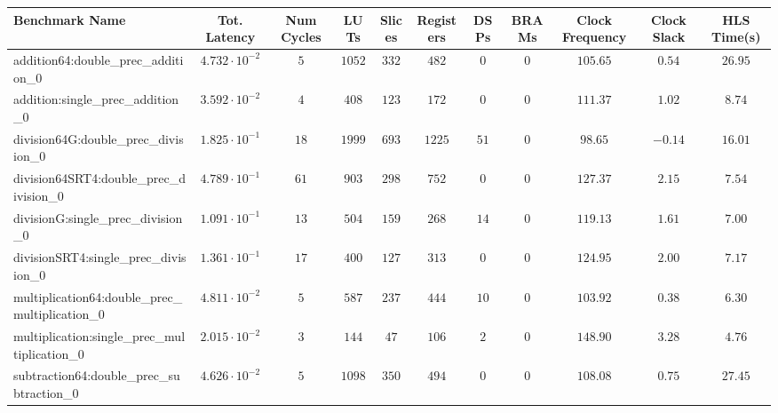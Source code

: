 \begin{tabular}{|l|c|c|c|c|c|c|c|c|c|c|}
\hline
Benchmark Name                                   & Tot. Latency            & Num Cycles & LUTs     & Slices   & Registers & DSPs   & BRAMs & Clock Frequency & Clock Slack & HLS Time(s) \\
\hline
addition64:double\_prec\_addition\_0             & $ 4.732 \cdot 10^{-2} $ & $ 5      $ & $ 1052 $ & $ 332  $ & $ 482   $ & $ 0  $ & $ 0 $ & $ 105.65      $ & $ 0.54    $ & $ 26.95   $ \\
addition:single\_prec\_addition\_0               & $ 3.592 \cdot 10^{-2} $ & $ 4      $ & $ 408  $ & $ 123  $ & $ 172   $ & $ 0  $ & $ 0 $ & $ 111.37      $ & $ 1.02    $ & $ 8.74    $ \\
division64G:double\_prec\_division\_0            & $ 1.825 \cdot 10^{-1} $ & $ 18     $ & $ 1999 $ & $ 693  $ & $ 1225  $ & $ 51 $ & $ 0 $ & $ 98.65       $ & $ -0.14   $ & $ 16.01   $ \\
division64SRT4:double\_prec\_division\_0         & $ 4.789 \cdot 10^{-1} $ & $ 61     $ & $ 903  $ & $ 298  $ & $ 752   $ & $ 0  $ & $ 0 $ & $ 127.37      $ & $ 2.15    $ & $ 7.54    $ \\
divisionG:single\_prec\_division\_0              & $ 1.091 \cdot 10^{-1} $ & $ 13     $ & $ 504  $ & $ 159  $ & $ 268   $ & $ 14 $ & $ 0 $ & $ 119.13      $ & $ 1.61    $ & $ 7.00    $ \\
divisionSRT4:single\_prec\_division\_0           & $ 1.361 \cdot 10^{-1} $ & $ 17     $ & $ 400  $ & $ 127  $ & $ 313   $ & $ 0  $ & $ 0 $ & $ 124.95      $ & $ 2.00    $ & $ 7.17    $ \\
multiplication64:double\_prec\_multiplication\_0 & $ 4.811 \cdot 10^{-2} $ & $ 5      $ & $ 587  $ & $ 237  $ & $ 444   $ & $ 10 $ & $ 0 $ & $ 103.92      $ & $ 0.38    $ & $ 6.30    $ \\
multiplication:single\_prec\_multiplication\_0   & $ 2.015 \cdot 10^{-2} $ & $ 3      $ & $ 144  $ & $ 47   $ & $ 106   $ & $ 2  $ & $ 0 $ & $ 148.90      $ & $ 3.28    $ & $ 4.76    $ \\
subtraction64:double\_prec\_subtraction\_0       & $ 4.626 \cdot 10^{-2} $ & $ 5      $ & $ 1098 $ & $ 350  $ & $ 494   $ & $ 0  $ & $ 0 $ & $ 108.08      $ & $ 0.75    $ & $ 27.45   $ \\

\end{tabular}
